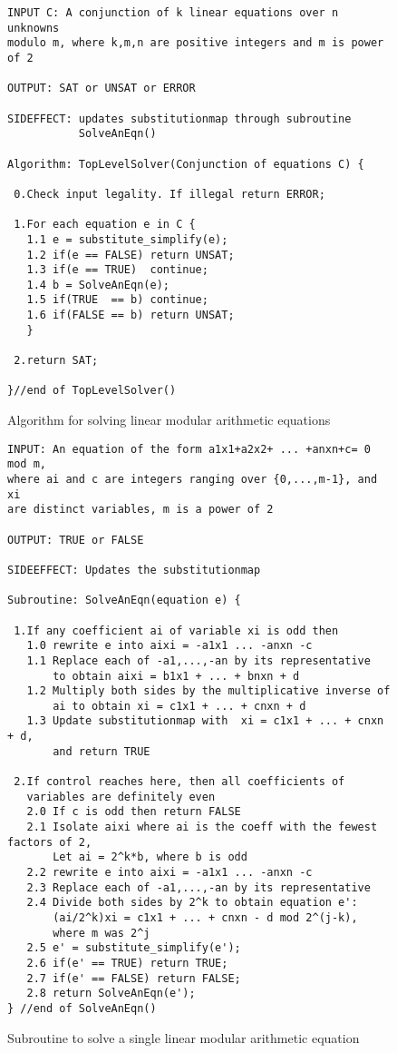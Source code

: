 \documentclass{article}
\begin{document}
\begin{figure} [p]
\begin{verbatim}
INPUT C: A conjunction of k linear equations over n unknowns 
modulo m, where k,m,n are positive integers and m is power 
of 2

OUTPUT: SAT or UNSAT or ERROR

SIDEFFECT: updates substitutionmap through subroutine 
           SolveAnEqn()

Algorithm: TopLevelSolver(Conjunction of equations C) {

 0.Check input legality. If illegal return ERROR;

 1.For each equation e in C {
   1.1 e = substitute_simplify(e);
   1.2 if(e == FALSE) return UNSAT;
   1.3 if(e == TRUE)  continue;
   1.4 b = SolveAnEqn(e);
   1.5 if(TRUE  == b) continue;
   1.6 if(FALSE == b) return UNSAT;
   }

 2.return SAT;

}//end of TopLevelSolver()
\end{verbatim}
\caption{\label{fig1} Algorithm for solving linear modular arithmetic
equations}
\end{figure}

\begin{figure} [p]
\begin{verbatim}
INPUT: An equation of the form a1x1+a2x2+ ... +anxn+c= 0 mod m, 
where ai and c are integers ranging over {0,...,m-1}, and xi 
are distinct variables, m is a power of 2

OUTPUT: TRUE or FALSE

SIDEEFFECT: Updates the substitutionmap

Subroutine: SolveAnEqn(equation e) {

 1.If any coefficient ai of variable xi is odd then
   1.0 rewrite e into aixi = -a1x1 ... -anxn -c
   1.1 Replace each of -a1,...,-an by its representative 
       to obtain aixi = b1x1 + ... + bnxn + d
   1.2 Multiply both sides by the multiplicative inverse of 
       ai to obtain xi = c1x1 + ... + cnxn + d
   1.3 Update substitutionmap with  xi = c1x1 + ... + cnxn + d, 
       and return TRUE

 2.If control reaches here, then all coefficients of 
   variables are definitely even   
   2.0 If c is odd then return FALSE 
   2.1 Isolate aixi where ai is the coeff with the fewest factors of 2,
       Let ai = 2^k*b, where b is odd
   2.2 rewrite e into aixi = -a1x1 ... -anxn -c
   2.3 Replace each of -a1,...,-an by its representative    
   2.4 Divide both sides by 2^k to obtain equation e': 
       (ai/2^k)xi = c1x1 + ... + cnxn - d mod 2^(j-k), 
       where m was 2^j
   2.5 e' = substitute_simplify(e');
   2.6 if(e' == TRUE) return TRUE;
   2.7 if(e' == FALSE) return FALSE;
   2.8 return SolveAnEqn(e');
} //end of SolveAnEqn()
\end{verbatim}
\caption{\label{fig2} Subroutine to solve a single linear modular
arithmetic equation}
\end{figure}
 
\end{document}
